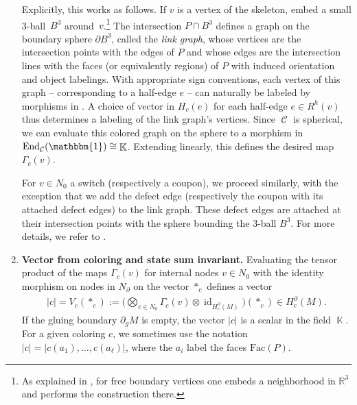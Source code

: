 \documentclass[10pt,a4paper]{amsart}
\DeclareMathOperator{\id}{id}
\DeclareMathOperator{\End}{End}
\DeclareMathOperator{\Hom}{Hom}
\DeclareMathOperator{\K}{\mathbb{K}}
\DeclareMathOperator{\calc}{\mathcal{C}}
\numberwithin{equation}{section}
\theoremstyle{definition}
\begin{document}
\begin{enumerate}
 Explicitly, this works as follows. If $v$ is a vertex of the skeleton, embed a small 3-ball~$B^3$ around~$v$.\footnote{As explained in \cite{F}, for free boundary vertices one embeds a neighborhood in $\mathbb{R}^3$ and performs the construction there.} The intersection $P \cap B^3$ defines a graph on the boundary sphere $\partial B^3$, called the \textit{link graph}, whose vertices are the intersection points with the edges of $P$ and whose edges are the intersection lines with the faces (or equivalently regions) of $P$ with induced orientation and object labelings. With appropriate sign conventions, each vertex of this graph -- corresponding to a half-edge $e$ -- can naturally be labeled by morphisms in \smash{$H_c(e) = \Hom_{\calc}\bigl(\mathbbm{1}, x_1^{\varepsilon(1)} \otimes \dots \otimes x_k^{\varepsilon(k)}\bigr)$}. A choice of vector in $H_c(e)$ for each half-edge $e \in R^h(v)$ thus determines a labeling of the link graph's vertices. Since $\calc$ is spherical, we can evaluate this colored graph on the sphere to a morphism in $\End_{\calc}(\mathbbm{1}) \cong \K$. Extending linearly, this defines the desired map $\Gamma_c(v)$.

 For $v \in N_0$ a switch (respectively a coupon), we proceed similarly, with the exception that we add the defect edge (respectively the coupon with its attached defect edges) to the link graph. These defect edges are attached at their intersection points with the sphere bounding the 3-ball $B^3$. For more details, we refer to \cite[Section~15.5.1]{TV}.

 \item \textbf{Vector from coloring and state sum invariant.} Evaluating the tensor product of the maps $\Gamma_c(v)$ for internal nodes $v \in N_0$ with the identity morphism on nodes in $N_{\partial}$ on the vector $*_c$ defines a vector
 \begin{align}
 \label{eqCol}
 |c| = V_c(*_c) := \biggl(\bigotimes_{v \in N_0}\Gamma_c(v) \otimes \id_{H_c^{\partial}(M)} \biggr)(*_c) \in H_c^{\partial}(M).
 \end{align}
 If the gluing boundary $\partial_gM$ is empty, the vector $|c|$ is a scalar in the field $\K$. For a given coloring $c$, we sometimes use the notation $|c| = |c(a_1), \dots, c(a_{\ell})|$, where the $a_i$ label the faces $\mathrm{Fac}(P)$.


\end{enumerate}
\end{document}
